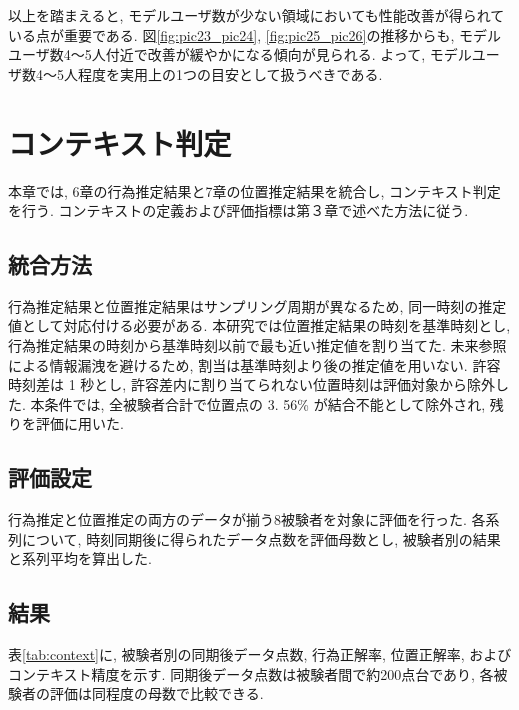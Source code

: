 \documentclass[a4paper,12pt]{jreport}
\begin{document}
以上を踏まえると, モデルユーザ数が少ない領域においても性能改善が得られている点が重要である. 図\ref{fig:pic23_pic24}, \ref{fig:pic25_pic26}の推移からも, モデルユーザ数4〜5人付近で改善が緩やかになる傾向が見られる. よって, モデルユーザ数4〜5人程度を実用上の1つの目安として扱うべきである. 



\chapter{コンテキスト判定}
本章では, 6章の行為推定結果と7章の位置推定結果を統合し, コンテキスト判定を行う. コンテキストの定義および評価指標は第３章で述べた方法に従う. 

\section{統合方法}
行為推定結果と位置推定結果はサンプリング周期が異なるため, 同一時刻の推定値として対応付ける必要がある. 本研究では位置推定結果の時刻を基準時刻とし, 行為推定結果の時刻から基準時刻以前で最も近い推定値を割り当てた. 未来参照による情報漏洩を避けるため, 割当は基準時刻より後の推定値を用いない. 許容時刻差は 1 秒とし, 許容差内に割り当てられない位置時刻は評価対象から除外した. 
本条件では, 全被験者合計で位置点の 3. 56\% が結合不能として除外され, 残りを評価に用いた. 

\section{評価設定}
行為推定と位置推定の両方のデータが揃う8被験者を対象に評価を行った. 各系列について, 時刻同期後に得られたデータ点数を評価母数とし, 被験者別の結果と系列平均を算出した. 

\section{結果}
表\ref{tab:context}に, 被験者別の同期後データ点数, 行為正解率, 位置正解率, およびコンテキスト精度を示す. 同期後データ点数は被験者間で約200点台であり, 各被験者の評価は同程度の母数で比較できる. 
\end{document}
